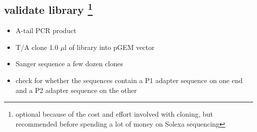 %
%
%
%
%
%
\subsection
{validate library \protect \footnote{optional because of the cost and effort involved with cloning, but recommended before spending a lot of money on Solexa sequencing}}
\begin{itemize}
\item A-tail PCR product
\item T/A clone 1.0 $\mu$l of library into pGEM vector
\item Sanger sequence a few dozen clones
\item check for whether the sequences contain a P1 adapter sequence on one end and a P2 adapter sequence on the other
\end{itemize}

